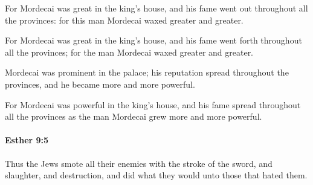 			For Mordecai was great in the king’s house, and his fame went out throughout all the provinces: for this man Mordecai waxed greater and greater.

			\begin{versebox}
					\item[BHS] 
					\item[LXX] 
					\item[ASV] For Mordecai was great in the king's house, and his fame went forth throughout all the provinces; for the man Mordecai waxed greater and greater.
					\item[NIV] Mordecai was prominent in the palace; his reputation spread throughout the provinces, and he became more and more powerful.
					\item[NRSV] For Mordecai was powerful in the king’s house, and his fame spread throughout all the provinces as the man Mordecai grew more and more powerful.
			\end{versebox}

		\paragraph{Esther 9:5} %
			\label{ESTHER-9-5}

			Thus the Jews smote all their enemies with the stroke of the sword, and slaughter, and destruction, and did what they would unto those that hated them.

